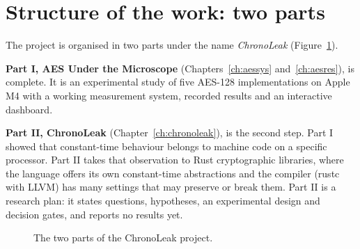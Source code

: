 \section{Structure of the work: two parts}

The project is organised in two parts under the name \emph{ChronoLeak} (Figure~\ref{fig:twoparts}).

\textbf{Part I, AES Under the Microscope} (Chapters~\ref{ch:aessys} and~\ref{ch:aesres}), is complete. It is an experimental study of five AES-128 implementations on Apple M4 with a working measurement system, recorded results and an interactive dashboard.

\textbf{Part II, ChronoLeak} (Chapter~\ref{ch:chronoleak}), is the second step. Part I showed that constant-time behaviour belongs to machine code on a specific processor. Part II takes that observation to Rust cryptographic libraries, where the language offers its own constant-time abstractions and the compiler (rustc with LLVM) has many settings that may preserve or break them. Part II is a research plan: it states questions, hypotheses, an experimental design and decision gates, and reports no results yet.

\begin{figure}[htbp]
\centering
{}
\caption{The two parts of the ChronoLeak project.}
\label{fig:twoparts}
\end{figure}

